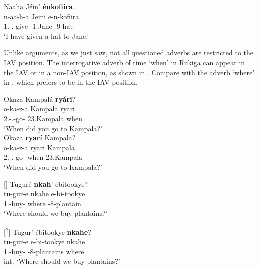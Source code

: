 \documentclass[output=paper]{langscibook}
\begin{document}
\ex
Naaha Jéín’ \textbf{énkofiira}.\\
\gll
n-aa-h-a  Jeini  e-n-kofiira\\
1\SG{}.\SM{}-\N{}.\PST{}-give-\FV{}  1.Jane  \AUG{}-9-hat\\
\glt
‘I have given a hat to Jane.’\\


\z
\z

Unlike arguments, as we just saw, not all questioned adverbs are restricted to the IAV position. The interrogative adverb of time ‘when’ in Rukiga can appear in the IAV or in a non-IAV position, as shown in . Compare with the adverb ‘where’ in , which prefers to be in the IAV position. 

\ea
\label{bkm:Ref113443019}
\ea
Okaza Kampálá \textbf{ryári}?\\
\gll
o-ka-z-a  Kampala  ryari \\
2\SG{}.\SM{}-\F{}.\PST{}-go-\FV{}  23.Kampala  when\\
\glt
‘When did you go to Kampala?’\\


\ex
Okaza \textbf{ryarí} Kampala?\\
\gll
o-ka-z-a  ryari  Kampala\\
2\SG{}.\SM{}-\F{}.\PST{}-go-\FV{}  when  23.Kampala\\
\glt
‘When did you go to Kampala?’\\


\z
\z

\ea
\label{bkm:Ref113443274}
\ea
[]{
Tuguré \textbf{nkah}’ ébitookye?\\
\gll
tu-gur-e  nkahe  e-bi-tookye\\
1\PL{}.\SM{}-buy-\SBJV{}  where  \AUG{}-8-plantain\\
\glt
‘Where should we buy plantains?’\\
}


\ex
[\textsuperscript{?}]{
Tugur’ ébitookye \textbf{nkahe}?\\
\gll
tu-gur-e  e-bi-tookye  nkahe\\
1\PL{}.\SM{}-buy-\SBJV{}  \AUG{}-8-plantains  where\\
\glt
int. ‘Where should we buy plantains?’\\
}
\end{document}
